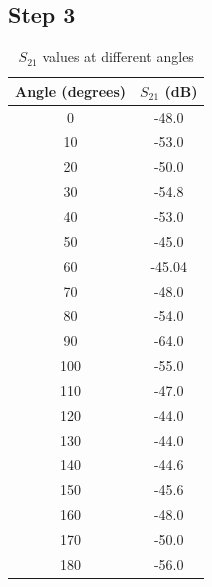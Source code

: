 \documentclass{article} %
\begin{document}
\subsection*{Step 3}

\begin{table}[h!]
    \centering
    \begin{tabular}{|c|c|}
        \hline
        \textbf{Angle (degrees)} & \textbf{$S_{21}$ (dB)} \\
        \hline
        0                        & -48.0                  \\
        10                       & -53.0                  \\
        20                       & -50.0                  \\
        30                       & -54.8                  \\
        40                       & -53.0                  \\
        50                       & -45.0                  \\
        60                       & -45.04                 \\
        70                       & -48.0                  \\
        80                       & -54.0                  \\
        90                       & -64.0                  \\
        100                      & -55.0                  \\
        110                      & -47.0                  \\
        120                      & -44.0                  \\
        130                      & -44.0                  \\
        140                      & -44.6                  \\
        150                      & -45.6                  \\
        160                      & -48.0                  \\
        170                      & -50.0                  \\
        180                      & -56.0                  \\
        \hline
    \end{tabular}
    \caption{$S_{21}$ values at different angles}
\end{table}
\end{document}
